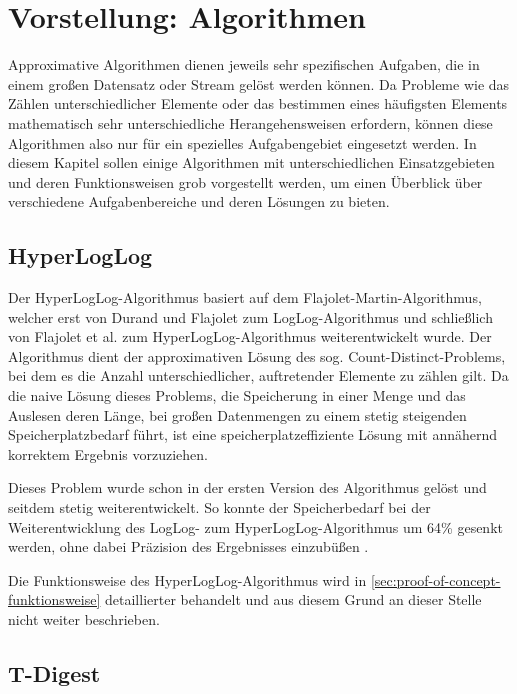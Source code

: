 \section{Vorstellung: Algorithmen}

Approximative Algorithmen dienen jeweils sehr spezifischen Aufgaben, die in einem großen Datensatz oder Stream gelöst werden können.
Da Probleme wie das Zählen unterschiedlicher Elemente oder das bestimmen eines häufigsten Elements mathematisch sehr unterschiedliche Herangehensweisen erfordern, können diese Algorithmen also nur für ein spezielles Aufgabengebiet eingesetzt werden.
In diesem Kapitel sollen einige Algorithmen mit unterschiedlichen Einsatzgebieten und deren Funktionsweisen grob vorgestellt werden, um einen Überblick über verschiedene Aufgabenbereiche und deren Lösungen zu bieten.

\subsection{HyperLogLog}

Der HyperLogLog-Algorithmus basiert auf dem Flajolet-Martin-Algorithmus, welcher erst von Durand und Flajolet \cite{durand2003} zum LogLog-Algorithmus und schließlich von Flajolet et al. \cite{flajolet2007} zum HyperLogLog-Algorithmus weiterentwickelt wurde.
Der Algorithmus dient der approximativen Lösung des sog. Count-Distinct-Problems, bei dem es die Anzahl unterschiedlicher, auftretender Elemente zu zählen gilt.
Da die naive Lösung dieses Problems, die Speicherung in einer Menge und das Auslesen deren Länge, bei großen Datenmengen zu einem stetig steigenden Speicherplatzbedarf führt, ist eine speicherplatzeffiziente Lösung mit annähernd korrektem Ergebnis vorzuziehen.

Dieses Problem wurde schon in der ersten Version des Algorithmus gelöst und seitdem stetig weiterentwickelt.
So konnte der Speicherbedarf bei der Weiterentwicklung des LogLog- zum HyperLogLog-Algorithmus um 64\% gesenkt werden, ohne dabei Präzision des Ergebnisses einzubüßen \cite{flajolet2007}.

Die Funktionsweise des HyperLogLog-Algorithmus wird in \autoref{sec:proof-of-concept-funktionsweise} detaillierter behandelt und aus diesem Grund an dieser Stelle nicht weiter beschrieben.

\subsection{T-Digest}


